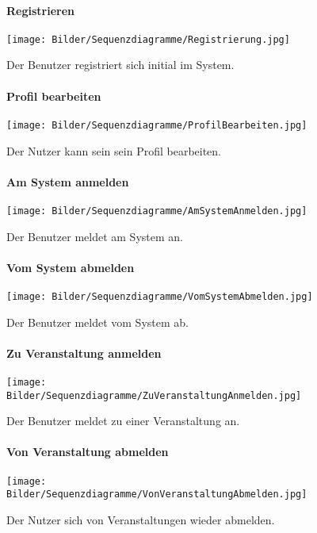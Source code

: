 \documentclass[12pt,a4paper]{article}
\begin{document}
\begin{figure}[H]
	\centering
	\paragraph{Registrieren}
	\texttt{[image: Bilder/Sequenzdiagramme/Registrierung.jpg]}
	\caption{Der Benutzer registriert sich initial im System.}
	\label{SzRegistrieren}
\end{figure}
\begin{figure}[H]
	\centering
	\paragraph{Profil bearbeiten}
	\texttt{[image: Bilder/Sequenzdiagramme/ProfilBearbeiten.jpg]}
	\caption{Der Nutzer kann sein sein Profil bearbeiten.}
	\label{SzProfilBearbeiten}
\end{figure}
\begin{figure}[H]
	\centering
	\paragraph{Am System anmelden}
	\texttt{[image: Bilder/Sequenzdiagramme/AmSystemAnmelden.jpg]}
	\caption{Der Benutzer meldet am System an.}
	\label{SzAmSystemAnmelden}
\end{figure}
\begin{figure}[H]
	\centering
	\paragraph{Vom System abmelden}
	\texttt{[image: Bilder/Sequenzdiagramme/VomSystemAbmelden.jpg]}
	\caption{Der Benutzer meldet vom System ab.}
	\label{SzVomSystemAbmelden}
\end{figure}
\begin{figure}[H]
	\centering
	\paragraph{Zu Veranstaltung anmelden}
	\texttt{[image: Bilder/Sequenzdiagramme/ZuVeranstaltungAnmelden.jpg]}
	\caption{Der Benutzer meldet zu einer Veranstaltung an.}
	\label{SzZuVeranstaltungAnmelden}
\end{figure}
\begin{figure}[H]
	\centering
	\paragraph{Von Veranstaltung abmelden}
	\texttt{[image: Bilder/Sequenzdiagramme/VonVeranstaltungAbmelden.jpg]}
	\caption{Der Nutzer sich von Veranstaltungen wieder abmelden.}
	\label{SzVonVeranstaltungAbmelden}
\end{figure}
\end{document}
